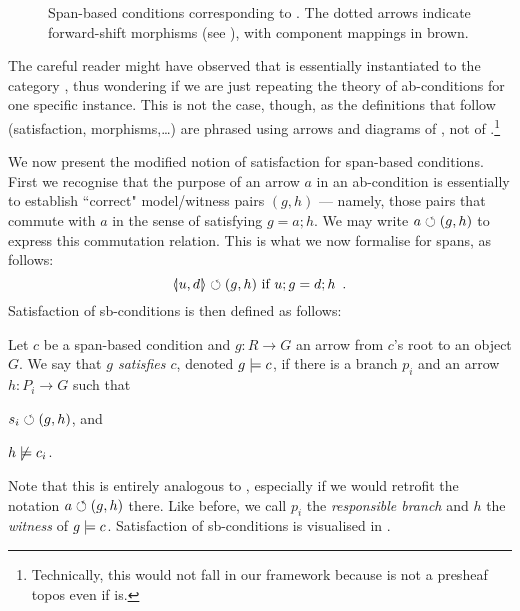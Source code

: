 \begin{figure}[t]
\centering

\vspace*{-5mm}
\caption{Span-based conditions corresponding to . The dotted arrows indicate forward-shift morphisms (see ), with component mappings in brown.}
\end{figure}

\medskip\noindent The careful reader might have observed that  is essentially  instantiated to the category {\SpanC}, thus wondering if we are just repeating the theory of ab-conditions for one specific instance. This is not the case, though, as the definitions that follow (satisfaction, morphisms,\ldots) are phrased using arrows and diagrams of , not of {\SpanC}.\footnote{Technically, this would not fall in our framework because {\SpanC} is not a presheaf topos even if  is.}

We now present the modified notion of satisfaction for span-based conditions. First we recognise that the purpose of an arrow $a$ in an ab-condition is essentially to establish ``correct" model/witness pairs $(g,h)$ --- namely, those pairs that commute with $a$ in the sense of satisfying $g=a;h$. We may write $a\circlearrowleft (g,h)$ to express this commutation relation. This is what we now formalise for spans, as follows:
\[ \spanof u d \commutes (g,h) \text{ if } u;g=d;h \enspace. \]
Satisfaction of sb-conditions is then defined as follows:

\begin{definition}
  Let $c$ be a span-based condition and $g:R\to G$ an arrow from $c$'s root to an object $G$. We say that \emph{$g$ satisfies $c$}, denoted $g\models c$, if there is a branch $p_i$ and an arrow $h:P_i\to G$ such that
  \begin{enumerate*}
  \item $s_i \circlearrowleft (g, h)$, and
  \item $h\not\models c_i$.
  \end{enumerate*}
\end{definition}
%
Note that this is entirely analogous to , especially if we would retrofit the notation $a\circlearrowleft (g,h)$ there. Like before, we call $p_i$ the \emph{responsible branch} and $h$ the \emph{witness} of $g\models c$. Satisfaction of sb-conditions is visualised in .

